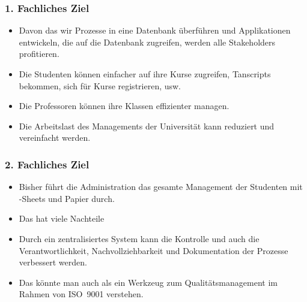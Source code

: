 \documentclass[aspectratio=169,mathserif,notheorems]{beamer}%
\begin{document}
\begin{frame}%
\frametitle{1. Fachliches Ziel}%
\begin{itemize}%
%
\item Davon das wir Prozesse in eine Datenbank überführen und Applikationen entwickeln, die auf die Datenbank zugreifen, werden alle Stakeholders profitieren.%
%
\item<2-> Die Studenten können einfacher auf ihre Kurse zugreifen, Tanscripts bekommen, sich für Kurse registrieren, usw.%
%
\item<3-> Die Professoren können ihre Klassen effizienter managen.%
%
\item<4-> Die Arbeitslast des Managements der Universität kann reduziert und vereinfacht werden.%
%
\end{itemize}%
\end{frame}%
%
%
\begin{frame}%
\frametitle{2. Fachliches Ziel}%
\begin{itemize}%
%
\item Bisher führt die Administration das gesamte Management der Studenten mit \microsoftExcel-Sheets und Papier durch.%
%
\item<2-> Das hat viele Nachteile%
%
\item<7-> Durch ein zentralisiertes System kann die Kontrolle und auch die Verantwortlichkeit, Nachvollziehbarkeit und Dokumentation der Prozesse verbessert werden.%
%
\item<8-> Das könnte man auch als ein Werkzeug zum Qualitätsmanagement im Rahmen von ISO~9001\cite{ISO180912019,ISO90012015} verstehen.%
%
\end{itemize}%
\end{frame}%
%
%
\end{document}
